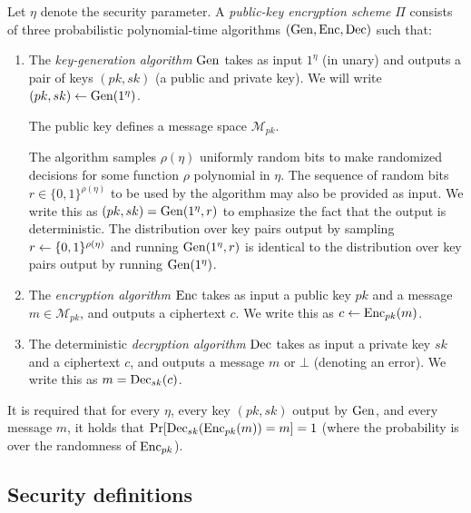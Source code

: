 \begin{definition} \label{def:public-key-encryption}
	Let $\eta$ denote the security parameter.
	A \emph{public-key encryption scheme} $\Pi$ consists of three probabilistic polynomial-time algorithms $(\mathrm{Gen}, \mathrm{Enc}, \mathrm{Dec})$ such that:
	\begin{enumerate}[1.]
		\item The \emph{key-generation algorithm} $\mathrm{Gen}$ takes as input $1^\eta$ (in unary) and outputs a pair of keys $(pk, sk)$ (a public and private key). We will write $(pk, sk) \leftarrow \mathrm{Gen}(1^\eta)$.

		      The public key defines a message space $\mathcal{M}_{pk}$.

		      The algorithm samples $\rho(\eta)$ uniformly random bits to make randomized decisions for some function $\rho$ polynomial in $\eta$. The sequence of random bits $r \in \{0, 1\}^{\rho(\eta)}$ to be used by the algorithm may also be provided as input. We write this as $(pk, sk) = \mathrm{Gen}(1^\eta, r)$ to emphasize the fact that the output is deterministic. The distribution over key pairs output by sampling $r \leftarrow \{0, 1\}^{\rho(\eta)}$ and running $\mathrm{Gen}(1^\eta, r)$ is identical to the distribution over key pairs output by running $\mathrm{Gen}(1^\eta)$.


		\item The \emph{encryption algorithm} $\mathrm{Enc}$ takes as input a public key $pk$ and a message $m \in \mathcal{M}_{pk}$, and outputs a ciphertext $c$. We write this as $c \leftarrow \mathrm{Enc}_{pk}(m)$.
		\item The deterministic \emph{decryption algorithm} $\mathrm{Dec}$ takes as input a private key $sk$ and a ciphertext $c$, and outputs a message $m$ or $\bot$ (denoting an error). We write this as $m = \mathrm{Dec}_{sk}(c)$.
	\end{enumerate}

	It is required that for every $\eta$, every key $(pk, sk)$ output by $\mathrm{Gen}$, and every message $m$, it holds that $\pr{\dec_{sk}(\enc_{pk}(m)) = m} = 1$ (where the probability is over the randomness of $\mathrm{Enc}_{pk}$).
\end{definition}

\subsection{Security definitions}

